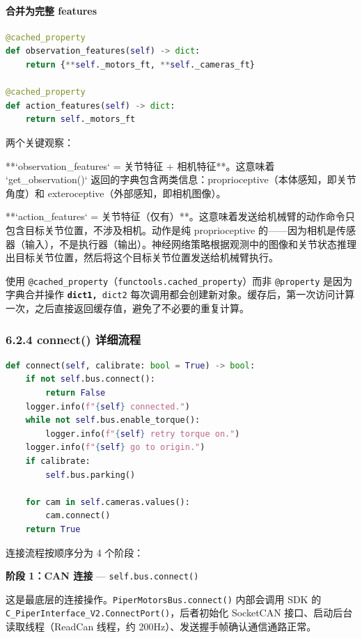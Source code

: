\documentclass[UTF8,a4paper,11pt]{ctexart}
\begin{document}
{\paragraph{合并为完整 features}


\begin{lstlisting}[language=python]
@cached_property
def observation_features(self) -> dict:
    return {**self._motors_ft, **self._cameras_ft}

@cached_property
def action_features(self) -> dict:
    return self._motors_ft
\end{lstlisting}

两个关键观察：

\item[1] **`observation_features` = 关节特征 + 相机特征**。这意味着 `get_observation()` 返回的字典包含两类信息：proprioceptive（本体感知，即关节角度）和 exteroceptive（外部感知，即相机图像）。
\item[2] **`action_features` = 关节特征（仅有）**。这意味着发送给机械臂的动作命令只包含目标关节位置，不涉及相机。动作是纯 proprioceptive 的——因为相机是传感器（输入），不是执行器（输出）。神经网络策略根据观测中的图像和关节状态推理出目标关节位置，然后将这个目标关节位置发送给机械臂执行。

使用 \texttt{@cached_property}（\texttt{functools.cached_property}）而非 \texttt{@property} 是因为字典合并操作 \texttt{{\textbf{dict1, }dict2}} 每次调用都会创建新对象。缓存后，第一次访问计算一次，之后直接返回缓存值，避免了不必要的重复计算。

\subsubsection{6.2.4 connect() 详细流程}

\begin{lstlisting}[language=python]
def connect(self, calibrate: bool = True) -> bool:
    if not self.bus.connect():
        return False
    logger.info(f"{self} connected.")
    while not self.bus.enable_torque():
        logger.info(f"{self} retry torque on.")
    logger.info(f"{self} go to origin.")
    if calibrate:
        self.bus.parking()

    for cam in self.cameras.values():
        cam.connect()
    return True
\end{lstlisting}

连接流程按顺序分为 4 个阶段：

\textbf{阶段 1：CAN 连接} — \texttt{self.bus.connect()}

这是最底层的连接操作。\texttt{PiperMotorsBus.connect()} 内部会调用 SDK 的 \texttt{C_PiperInterface_V2.ConnectPort()}，后者初始化 SocketCAN 接口、启动后台读取线程（ReadCan 线程，约 200Hz）、发送握手帧确认通信通路正常。

}
\end{document}
